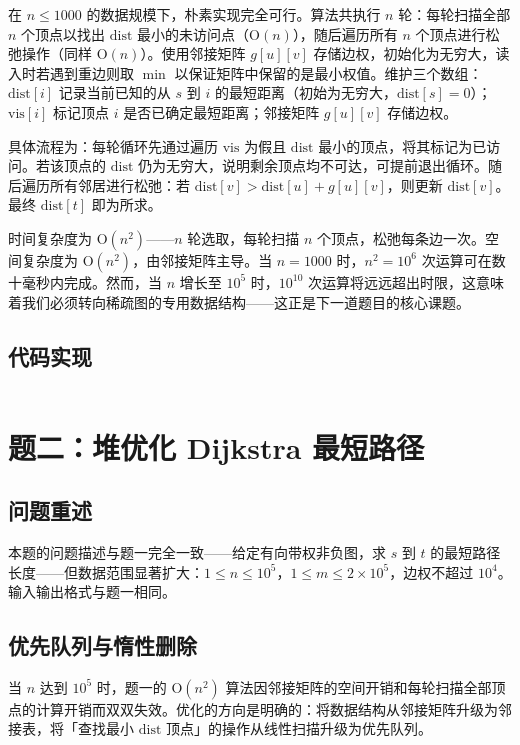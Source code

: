 \documentclass[12pt, a4paper]{academics}
\begin{document}
在 $n \le 1000$ 的数据规模下，朴素实现完全可行。算法共执行 $n$ 轮：每轮扫描全部 $n$ 个顶点以找出 $\mathrm{dist}$ 最小的未访问点（$\mathrm{O}(n)$），随后遍历所有 $n$ 个顶点进行松弛操作（同样 $\mathrm{O}(n)$）。使用邻接矩阵 $\mathit{g}[u][v]$ 存储边权，初始化为无穷大，读入时若遇到重边则取 $\min$ 以保证矩阵中保留的是最小权值。维护三个数组：$\mathrm{dist}[i]$ 记录当前已知的从 $s$ 到 $i$ 的最短距离（初始为无穷大，$\mathrm{dist}[s] = 0$）；$\mathrm{vis}[i]$ 标记顶点 $i$ 是否已确定最短距离；邻接矩阵 $\mathit{g}[u][v]$ 存储边权。

具体流程为：每轮循环先通过遍历 $\mathrm{vis}$ 为假且 $\mathrm{dist}$ 最小的顶点，将其标记为已访问。若该顶点的 $\mathrm{dist}$ 仍为无穷大，说明剩余顶点均不可达，可提前退出循环。随后遍历所有邻居进行松弛：若 $\mathrm{dist}[v] > \mathrm{dist}[u] + \mathit{g}[u][v]$，则更新 $\mathrm{dist}[v]$。最终 $\mathrm{dist}[t]$ 即为所求。

时间复杂度为 $\mathrm{O}(n^2)$——$n$ 轮选取，每轮扫描 $n$ 个顶点，松弛每条边一次。空间复杂度为 $\mathrm{O}(n^2)$，由邻接矩阵主导。当 $n = 1000$ 时，$n^2 = 10^6$ 次运算可在数十毫秒内完成。然而，当 $n$ 增长至 $10^5$ 时，$10^{10}$ 次运算将远远超出时限，这意味着我们必须转向稀疏图的专用数据结构——这正是下一道题目的核心课题。

\subsection{代码实现}

\inputminted{c++}{../src/p1_dijkstra_naive.cpp}

\section{题二：堆优化 Dijkstra 最短路径}

\subsection{问题重述}

本题的问题描述与题一完全一致——给定有向带权非负图，求 $s$ 到 $t$ 的最短路径长度——但数据范围显著扩大：$1 \le n \le 10^5$，$1 \le m \le 2 \times 10^5$，边权不超过 $10^4$。输入输出格式与题一相同。

\subsection{优先队列与惰性删除}

当 $n$ 达到 $10^5$ 时，题一的 $\mathrm{O}(n^2)$ 算法因邻接矩阵的空间开销和每轮扫描全部顶点的计算开销而双双失效。优化的方向是明确的：将数据结构从邻接矩阵升级为邻接表，将「查找最小 $\mathrm{dist}$ 顶点」的操作从线性扫描升级为优先队列。
\end{document}
